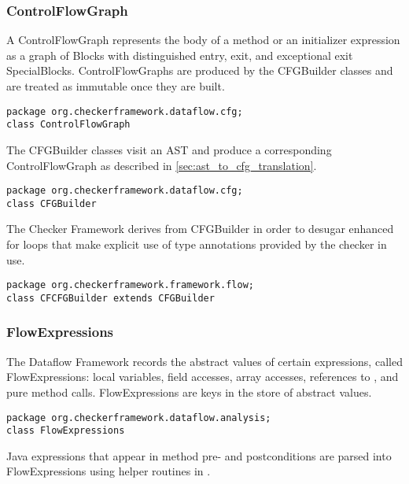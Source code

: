 \subsubsection{ControlFlowGraph}
\label{sec:control_flow_graph_class}

A ControlFlowGraph represents the body of a method or an initializer
expression as a graph of Blocks with distinguished entry, exit, and
exceptional exit SpecialBlocks.  ControlFlowGraphs are produced by the
CFGBuilder classes and are treated as immutable once they are built.

\begin{verbatim}
package org.checkerframework.dataflow.cfg;
class ControlFlowGraph
\end{verbatim}

\label{sec:cfg_builder_classes}

The CFGBuilder classes visit an AST and produce a corresponding
ControlFlowGraph as described in \autoref{sec:ast_to_cfg_translation}.

\begin{verbatim}
package org.checkerframework.dataflow.cfg;
class CFGBuilder
\end{verbatim}

The Checker Framework derives from CFGBuilder in order to desugar
enhanced for loops that make explicit use of type annotations provided
by the checker in use.

\begin{verbatim}
package org.checkerframework.framework.flow;
class CFCFGBuilder extends CFGBuilder
\end{verbatim}


\subsubsection{FlowExpressions}
\label{sec:flow_expressions_class}

The Dataflow Framework records the abstract values of certain
expressions, called FlowExpressions: local variables, field accesses,
array accesses, references to , and pure method calls.
FlowExpressions are keys in the store of abstract values.

\begin{verbatim}
package org.checkerframework.dataflow.analysis;
class FlowExpressions
\end{verbatim}

Java expressions that appear in method pre- and postconditions are
parsed into FlowExpressions using helper routines in
.


